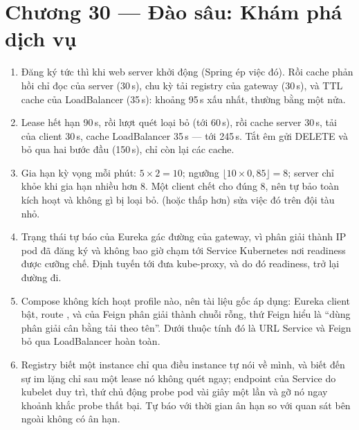 \section*{Chương 30 --- Đào sâu: Khám phá dịch vụ}
\begin{enumerate}
  \item Đăng ký tức thì khi web server khởi động (Spring ép việc đó).
  Rồi cache phản hồi chỉ đọc của server (30\,s), chu kỳ tải registry
  của gateway (30\,s), và TTL cache của LoadBalancer (35\,s): khoảng
  95\,s xấu nhất, thường bằng một nửa.
  \item Lease hết hạn 90\,s, rồi lượt quét loại bỏ (tới 60\,s), rồi
  cache server 30\,s, tải của client 30\,s, cache LoadBalancer 35\,s
  --- tới 245\,s. Tắt êm gửi DELETE và bỏ qua hai bước đầu (150\,s),
  chỉ còn lại các cache.
  \item Gia hạn kỳ vọng mỗi phút: $5 \times 2 = 10$; ngưỡng
  $\lfloor 10 \times 0{,}85 \rfloor = 8$; server chỉ khỏe khi gia hạn
  nhiều hơn 8. Một client chết cho đúng 8, nên tự bảo toàn kích hoạt
  và không gì bị loại bỏ.  (hoặc  thấp hơn) sửa việc đó
  trên đội tàu nhỏ.
  \item Trạng thái tự báo của Eureka gác đường của gateway, vì
   phân giải thành IP pod đã đăng ký và không bao giờ chạm
  tới Service Kubernetes nơi readiness được cưỡng chế. Định tuyến tới
   đưa kube-proxy, và do đó readiness,
  trở lại đường đi.
  \item Compose không kích hoạt profile nào, nên tài liệu gốc áp dụng:
  Eureka client bật, route , và  của Feign phân
  giải thành chuỗi rỗng, thứ Feign hiểu là ``dùng phân giải cân bằng
  tải theo tên''. Dưới  thuộc tính đó là URL Service và Feign
  bỏ qua LoadBalancer hoàn toàn.
  \item Registry biết một instance chỉ qua điều instance tự nói về
  mình, và biết đến sự im lặng chỉ sau một lease nó không quét ngay;
  endpoint của Service do kubelet duy trì, thứ chủ động probe pod vài
  giây một lần và gỡ nó ngay khoảnh khắc probe thất bại. Tự báo với
  thời gian ân hạn so với quan sát bên ngoài không có ân hạn.
\end{enumerate}

